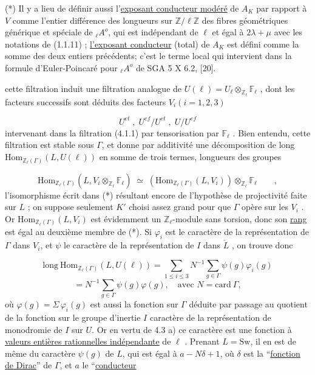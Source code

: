 (*) Il y a lieu de définir aussi l'\underline{exposant conducteur modéré} de $A_K$ par rapport à $V$ comme l'entier différence des longueurs sur $\mathbb{Z}/\ell\mathbb{Z}$ des fibres géométriques générique et spéciale de ${}_\ell A^o$, qui est indépendant de $\ell$ et égal à $2\lambda + \mu$ avec les notations de (1.1.11) ; \underline{l'exposant conducteur} (total) de $A_K$ est défini comme la somme des deux entiers précédents; c'est le terme local qui intervient dans la formule d'Euler-Poincaré pour ${}_\ell A^o$ de SGA 5 X 6.2, [20].



cette filtration induit une filtration analogue de $U(\ell) = U_\ell \otimes_{\mathbb{Z}_\ell} \mathbb{F}_\ell$ , dont les facteurs successifs sont déduits des facteurs $V_i(i=1,2,3)$

\begin{equation*}
U^{et} \; , \; U^{ef}/U^{et} \; , \; U/U^{ef}
\end{equation*}
intervenant dans la filtration (4.1.1) par tensorisation par $\mathbb{F}_\ell$ . Bien entendu, cette filtration est stable sous $\Gamma$, et donne par additivité une décomposition de long $\mathrm{Hom}_{\mathbb{Z}_\ell(\Gamma)}(L,U(\ell))$ en somme de trois termes, longueurs des groupes

\begin{equation}\tag{*}
\mathrm{Hom}_{\mathbb{Z}_\ell(\Gamma)}(L,V_i \otimes_{\mathbb{Z}_\ell} \mathbb{F}_\ell) \;\simeq\; (\mathrm{Hom}_{\mathbb{Z}_\ell(\Gamma)}(L,V_i)) \otimes_{\mathbb{Z}_\ell} \mathbb{F}_\ell \qquad ,
\end{equation}
l'isomorphisme écrit dans (*) résultant encore de l'hypothèse de projectivité faite sur $L$ ; on suppose seulement $K'$ choisi assez grand pour que $\Gamma$ opère sur les $V_i$ . Or $\mathrm{Hom}_{\mathbb{Z}_\ell(\Gamma)}(L,V_i)$ est évidemment un $\mathbb{Z}_\ell$-module sans torsion, donc son \underline{rang} est égal au deuxième membre de (*). Si $\varphi_i$ est le caractère de la représentation de $\Gamma$ dans $V_i$, et $\psi$ le caractère de la représentation de $I$ dans $\check{L}$ , on trouve donc

\begin{equation}\tag{4.6.1}
\mathrm{long}\ \mathrm{Hom}_{\mathbb{Z}_\ell(\Gamma)}(L,U(\ell)) = \sum_{1 \leq i \leq 3} N^{-1} \sum_{g \in \Gamma} \psi(g)\varphi_i(g)
\end{equation}
\begin{equation*}
= N^{-1} \sum_{g \in \Gamma} \psi(g)\varphi(g), \quad \mbox{avec } N = \mathrm{card}\ \Gamma,
\end{equation*}
où $\varphi(g) = \Sigma\, \varphi_i(g)$ est aussi la fonction sur $\Gamma$ déduite par passage au quotient de la fonction sur le groupe d'inertie $I$ caractère de la représentation de monodromie de $I$ sur $U$. Or en vertu de 4.3 a) ce caractère est une fonction à \underline{valeurs entières rationnelles indépendante} de $\ell$ . Prenant $L = \mathrm{Sw}$, il en est de même du caractère $\psi(g)$ de $L$, qui est égal à $a-N\delta+1$, où $\delta$ est la ``\underline{fonction de Dirac}'' de $\Gamma$, et $a$ le ``\underline{conducteur}



